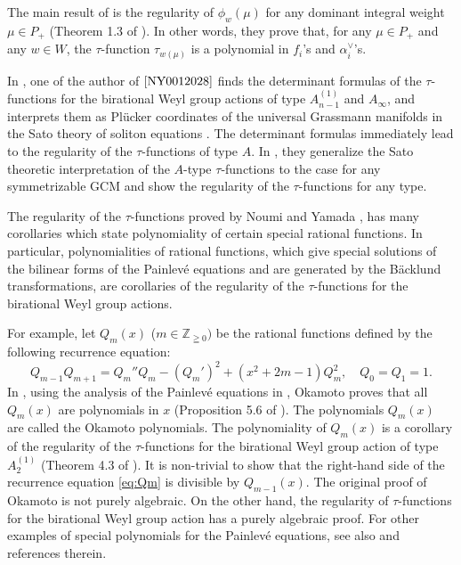 \documentclass[12pt,twoside]{article}
\newcommand\av{\alpha^\vee}
\newcommand\Z{{\mathbb Z}} %
\theoremstyle{plain} %
\theoremstyle{definition} %
\theoremstyle{definition} %
\numberwithin{theorem}{section}
\numberwithin{equation}{section}
\numberwithin{figure}{section}
\numberwithin{table}{section}
\begin{document}
The main result of \cite{NY0012028} is the regularity of $\phi_w(\mu)$ 
for any dominant integral weight $\mu\in P_+$ (Theorem 1.3 of \cite{NY0012028}).
In other words, they prove that, for any $\mu\in P_+$ and any $w\in W$, 
the $\tau$-function $\tau_{w(\mu)}$ is a polynomial in $f_i$'s and $\av_i$'s.

In \cite{Yamada9808002}, one of the author of $\cite{NY0012028}$ finds
the determinant formulas of the $\tau$-functions 
for the birational Weyl group actions of type $A^{(1)}_{n-1}$ and $A_\infty$,
and interprets them as Pl\"ucker coordinates of
the universal Grassmann manifolds in the Sato theory of soliton equations \cite{Sato-Sato}.
The determinant formulas immediately lead to 
the regularity of the $\tau$-functions of type $A$.
In \cite{NY0012028}, they generalize the Sato theoretic interpretation of 
the $A$-type $\tau$-functions to the case for any symmetrizable GCM
and show the regularity of the $\tau$-functions for any type.

The regularity of the $\tau$-functions proved by Noumi and Yamada \cite{Yamada9808002}, \cite{NY0012028}
has many corollaries which state polynomiality of certain special rational functions. 
In particular, polynomialities of rational functions, 
which give special solutions of the bilinear forms of the Painlev\'e equations 
and are generated by the B\"acklund transformations, 
are corollaries of the regularity of the $\tau$-functions
for the birational Weyl group actions.

For example, let $Q_m(x)$ ($m\in\Z_{\geqq0})$ be the rational functions 
defined by the following recurrence equation:
\begin{equation}
 Q_{m-1} Q_{m+1} = Q_m'' Q_m - (Q_m')^2 + (x^2+2m-1)Q_m^2,
 \quad Q_0=Q_1=1.
\label{eq:Qm}
\end{equation}
In \cite{OkamotoIII}, 
using the analysis of the Painlev\'e equations in \cite{Okamoto1981},
Okamoto proves that all $Q_m(x)$ are polynomials in $x$
(Proposition 5.6 of \cite{OkamotoIII}).
The polynomials $Q_m(x)$ are called the Okamoto polynomials.
The polynomiality of $Q_m(x)$ is a corollary of the regularity of
the $\tau$-functions for the birational Weyl group action of type $A^{(1)}_2$
(Theorem 4.3 of \cite{NY9708018}).
It is non-trivial to show that 
the right-hand side of the recurrence equation \eqref{eq:Qm} 
is divisible by $Q_{m-1}(x)$.
The original proof of Okamoto is not purely algebraic. 
On the other hand, 
the regularity of $\tau$-functions for the birational Weyl group action
has a purely algebraic proof.
%
For other examples of special polynomials for the Painlev\'e equations, 
see also \cite{Yamada-SP} and references therein.
\end{document}

